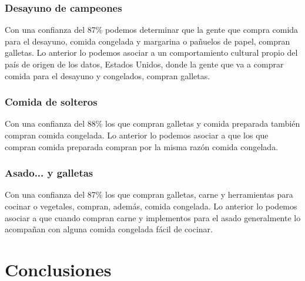 \documentclass{article}
\newcommand{\python}[2]{
  \begin{itemize}
    \item[]
  \end{itemize}
}
\begin{document}
\subsubsection*{Desayuno de campeones}

Con una confianza del 87\% podemos determinar que la gente que compra comida para el desayuno, comida congelada y margarina o pañuelos de papel, compran galletas. Lo anterior lo podemos asociar a un comportamiento cultural propio del país de origen de los datos, Estados Unidos, donde la gente que va a comprar comida para el desayuno y congelados, compran galletas.\\

\subsubsection*{Comida de solteros}

Con una confianza del 88\% los que compran galletas y comida preparada también compran comida congelada. Lo anterior lo podemos asociar a que los que compran comida preparada compran por la misma razón comida congelada.\\

\subsubsection*{Asado... y galletas}

Con una confianza del 87\% los que compran galletas, carne y  herramientas para cocinar o vegetales, compran, además, comida congelada. Lo anterior lo podemos asociar a que cuando compran carne y implementos para el asado generalmente lo acompañan con alguna comida congelada fácil de cocinar.

\section*{Conclusiones}

\lipsum




\end{document}
